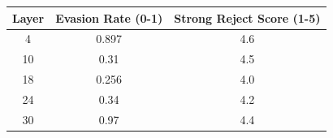 \begin{tabular}{ccc}
Layer & Evasion Rate (0-1) & Strong Reject Score (1-5) \\
\midrule
4 & 0.897 & 4.6 \\
10 & 0.31 & 4.5 \\
18 & 0.256 & 4.0 \\
24 & 0.34 & 4.2 \\
30 & 0.97 & 4.4 \\
\end{tabular}
